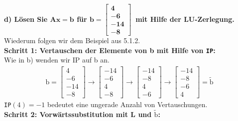 \documentclass[10pt,a4paper]{article}
\begin{document}
	\textbf{%
		d) Lösen Sie $\mathbf{Ax=b}$ für $\mathbf{b = \begin{bmatrix} 4 \\ -6 \\ -14  \\ -8 \end{bmatrix}}\,$ mit Hilfe der LU-Zerlegung.
	} \\
	Wiederum folgen wir dem Beispiel aus 5.1.2. \\
	\textbf{Schritt 1: Vertauschen der Elemente von b mit Hilfe von \texttt{IP}:}\\
	Wie in b) wenden wir IP auf b an.
	\begin{align*}
		\text{b} = \begin{bmatrix} 4 \\ -6 \\ -14  \\ -8 \end{bmatrix}
		\rightarrow
		\begin{bmatrix} -14 \\ -6 \\ 4  \\ -8 \end{bmatrix}
		\rightarrow
		\begin{bmatrix} -14 \\ -8 \\ 4  \\ -6 \end{bmatrix}
		\rightarrow
		\begin{bmatrix} -14 \\ -8 \\ -6  \\ 4 \end{bmatrix}
		= \tilde{\text{b}}
	\end{align*}
	\texttt{IP}$(4)=-1$ bedeutet eine ungerade Anzahl von Vertauschungen.\\
	\textbf{Schritt 2: Vorwärtssubstitution mit L und $\tilde{\text{b}}$:}
\end{document}
